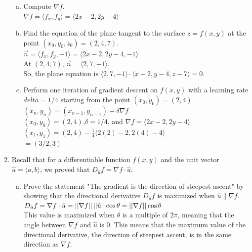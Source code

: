 \begin{enumerate}
\begin{enumerate}[a.]
		\item Compute $\nabla f$.\\
		\indent
		$\nabla f = \langle f_x, f_y\rangle=\langle 2x-2,2y-4\rangle$\\
		
		\item Find the equation of the plane tangent to the surface $z=f(x,y)$ at the point $(x_0,y_0,z_0)=(2,4,7)$.\\
		\indent
		$\vec{n}=\langle f_x, f_y, -1\rangle=\langle 2x-2, 2y-4, -1\rangle$\\
		At $(2,4,7)$, $\vec{n}=\langle 2,7,-1\rangle$.\\
		So, the plane equation is $\langle 2,7,-1\rangle\cdot\langle x-2, y-4, z-7\rangle=0$.\\
		
		\item Perform one iteration of gradient descent on $f(x,y)$ with a learning rate $delta = 1/4$ starting from the point $(x_0,y_0)=(2,4)$.\\
		\indent
		$(x_n,y_n)=(x_{n-1},y_{n-1})-\delta\nabla f$\\
		$(x_0,y_0)=(2,4)$,$\delta=1/4$, and $\nabla f=\langle 2x-2,2y-4\rangle$\\
		$(x_1,y_1)=(2,4)-\frac{1}{4}\langle 2(2)-2, 2(4)-4\rangle$\\
		$=(3/2, 3)$\\
	\end{enumerate}

	\item Recall that for a differentiable function $f(x,y)$ and the unit vector $\hat{u}=\langle a,b\rangle$, we proved that $D_{\hat{u}}f=\nabla f\cdot\hat{u}$.
	\begin{enumerate}[a.]
		\item Prove the statement "The gradient is the direction of steepest ascent" by showing that the directional derivative $D_{\hat{u}}f$ is maximized when $\hat{u}\parallel\nabla f$.\\
		\indent
		$D_{\hat{u}}f=\nabla f\cdot\hat{u}=\left|\left|\nabla f\right|\right|\left|\left|\hat{u}\right|\right|\cos{\theta}=\left|\left|\nabla f\right|\right|\cos{\theta}$\\
		This value is maximized when $\theta$ is a multiple of $2\pi$, meaning that the angle between $\nabla f$ and $\hat{u}$ is 0. This means that the maximum value of the directional derivative, the direction of steepest ascent, is in the same direction as $\nabla f$.\\
			

\end{enumerate}
\end{enumerate}
